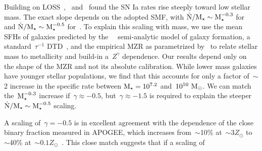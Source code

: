 \documentclass[ms.tex]{subfiles}
\begin{document}
Building on LOSS~\citep{Li2011},~\citet{Brown2019} and~\citet{Wiseman2021}
found the SN Ia rates rise steeply toward low stellar mass.
The exact slope depends on the adopted SMF, with
$\dot{\text{N}} / \text{M}_\star \sim \text{M}_\star^{-0.3}$ for~\citet{Baldry2012} and
$\dot{\text{N}} / \text{M}_\star \sim \text{M}_\star^{-0.5}$ for~\citet{Bell2003}.
To explain this scaling with mass, we use the mean SFHs of galaxies predicted
by the~\um~\citep{Behroozi2019} semi-analytic model of galaxy formation, a
standard~$\tau^{-1}$ DTD~\citep[e.g.,][]{Maoz2012a}, and the empirical MZR as
parametrized by~\citet{Zahid2014} to relate stellar mass to metallicity and
build-in a~$Z^\gamma$ dependence.
Our results depend only on the shape of the MZR and not its absolute
calibration.
While lower mass galaxies have younger stellar populations, we find that this
accounts for only a factor of~$\sim$2 increase in the specific rate between
$\text{M}_\star = 10^{7.2}$ and~$10^{10}~\text{M}_\odot$.
We can match the~$\text{M}_\star^{-0.3}$ increase if~$\gamma \approx -0.5$,
but~$\gamma \approx -1.5$ is required to explain the steeper
$\dot{\text{N}} / \text{M}_\star \sim \text{M}_\star^{-0.5}$ scaling.
\par
A scaling of~$\gamma = -0.5$ is in excellent agreement with the dependence of
the close binary fraction measured in APOGEE, which increases from~$\sim$10\%
at~$\sim$$3Z_\odot$ to~$\sim$40\% at~$\sim$$0.1Z_\odot$~\citep{Moe2019}.
This close match suggests that if a scaling of
\end{document}
